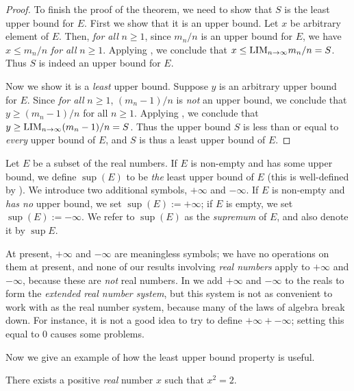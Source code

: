 \begin{proof}
To finish the proof of the theorem, we need to show that \(S\) is the least upper bound for \(E\).
First we show that it is an upper bound.
Let \(x\) be arbitrary element of \(E\).
Then, \emph{for all} \(n \ge 1\), since \(m_n/n\) is an upper bound for \(E\), we have \(x \le m_n/n\) \emph{for all} \(n \ge 1\).
Applying , we conclude that \(x \le \text{LIM}_{n \to \infty} m_n/n = S\).
Thus \(S\) is indeed an upper bound for \(E\).

Now we show it is a \emph{least} upper bound.
Suppose \(y\) is an arbitrary upper bound for \(E\).
Since \emph{for all} \(n \ge 1\), \((m_n - 1)/n\) is \emph{not} an upper bound, we conclude that \(y \ge (m_n - 1)/n\) for all \(n \ge 1\).
Applying , we conclude that \(y \ge \text{LIM}_{n \to \infty}(m_n - 1)/n = S\).
Thus the upper bound \(S\) is less than or equal to \emph{every} upper bound of \(E\), and \(S\) is thus a least upper bound of \(E\).
\end{proof}

\begin{definition}[Supremum]\label{5.5.10}
Let \(E\) be a subset of the real numbers.
If \(E\) is non-empty and has some upper bound, we define \(\sup(E)\) to be \emph{the} least upper bound of \(E\)
(this is well-defined by ).
We introduce two additional symbols, \(+\infty\) and \(-\infty\).
If \(E\) is non-empty and \emph{has no} upper bound, we set \(\sup(E) := +\infty\);
if \(E\) is empty, we set \(\sup(E) := -\infty\).
We refer to \(\sup(E)\) as the \emph{supremum} of \(E\), and also denote it by \(\sup E\).
\end{definition}

\begin{remark} \label{remark 5.5.11}
At present, \(+\infty\) and \(-\infty\) are meaningless symbols; 
we have no operations on them at present, and none of our results involving \emph{real numbers} apply to \(+\infty\) and \(-\infty\), because these are \emph{not} real numbers.
In  we add \(+\infty\) and \(-\infty\) to the reals to form the \emph{extended real number system}, but this system is not as convenient to work with as the real number system, because many of the laws of algebra break down.
For instance, it is not a good idea to try to define \(+\infty + -\infty\); setting this equal to 0 causes some problems.
\end{remark}

Now we give an example of how the least upper bound property is useful.

\begin{proposition} \label{prop 5.5.12}
There exists a positive \emph{real} number \(x\) such that \(x^2 = 2\).
\end{proposition}

